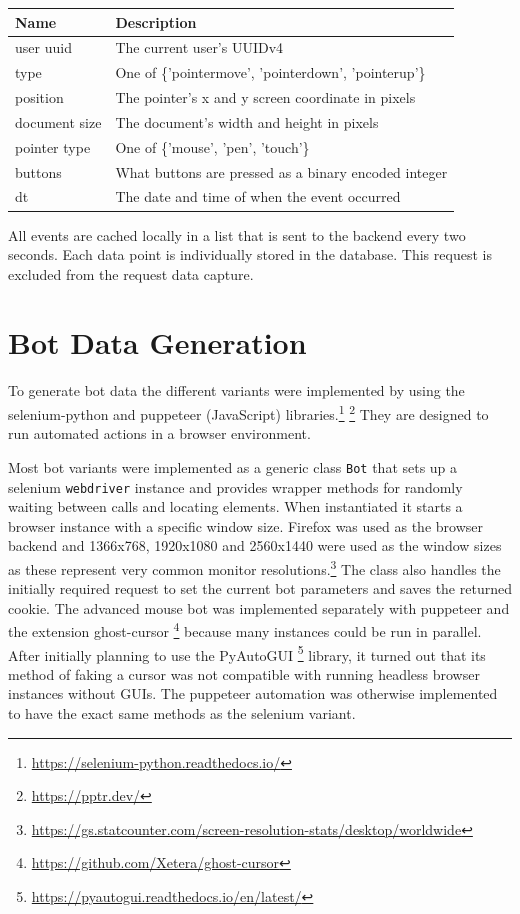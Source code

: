 \documentclass[
    fontsize=12pt,
    headings=small,
    parskip=half,           %
    bibliography=totoc,
    numbers=noenddot,       %
    open=any,               %
    final,                   %
    table
]{scrreprt}
\begin{document}
\begin{table}[H]
\begin{center}
\begin{tabular*}{\textwidth}{ll @{\extracolsep{\fill}}}
\toprule
Name & Description \\
\midrule
user uuid & The current user's UUIDv4 \\
type & One of \{'pointermove', 'pointerdown', 'pointerup'\} \\
position & The pointer's x and y screen coordinate in pixels \\
document size & The document's width and height in pixels \\
pointer type & One of \{'mouse', 'pen', 'touch'\} \\
buttons & What buttons are pressed as a binary encoded integer \\
dt & The date and time of when the event occurred \\
\bottomrule
\end{tabular*}
\end{center}
\end{table}

All events are cached locally in a list that is sent to the backend every two seconds. Each data point is individually stored in the database. This request is excluded from the request data capture.

\section{Bot Data Generation}

To generate bot data the different variants were implemented by using the selenium-python and puppeteer (JavaScript) libraries.\footnote{\url{https://selenium-python.readthedocs.io/}} \footnote{\url{https://pptr.dev/}} They are designed to run automated actions in a browser environment.

Most bot variants were implemented as a generic class \lstinline{Bot} that sets up a selenium \lstinline{webdriver} instance and provides wrapper methods for randomly waiting between calls and locating elements. When instantiated it starts a  browser instance with a specific window size. Firefox was used as the browser backend and 1366x768, 1920x1080 and 2560x1440 were used as the window sizes as these represent very common monitor resolutions.\footnote{\url{https://gs.statcounter.com/screen-resolution-stats/desktop/worldwide}} The class also handles the initially required request to set the current bot parameters and saves the returned cookie. The advanced mouse bot was implemented separately with puppeteer and the extension ghost-cursor \footnote{\url{https://github.com/Xetera/ghost-cursor}} because many instances could be run in parallel. After initially planning to use the PyAutoGUI \footnote{\url{https://pyautogui.readthedocs.io/en/latest/}} library, it turned out that its method of faking a cursor was not compatible with running headless browser instances without GUIs. The puppeteer automation was otherwise implemented to have the exact same methods as the selenium variant.
\end{document}

